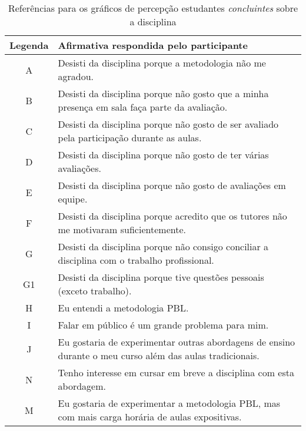 \begin{table}[h]
\caption{Referências para os gráficos de percepção estudantes \textit{concluintes} sobre a disciplina}
\label{tabela-ref-graficos3}
\begin{tabular}{c|p{14.6cm}}
Legenda & Afirmativa respondida pelo participante \\
\hline
A & Desisti da disciplina porque a metodologia não me agradou.\\
\hline
B & Desisti da disciplina porque não gosto que a minha presença em sala faça parte da avaliação.\\
\hline
C & Desisti da disciplina porque não gosto de ser avaliado pela participação durante as aulas.\\
\hline
D & Desisti da disciplina porque não gosto de ter várias avaliações.\\
\hline
E & Desisti da disciplina porque não gosto de avaliações em equipe.\\
\hline
F & Desisti da disciplina porque acredito que os tutores não me motivaram suficientemente.\\
\hline
G & Desisti da disciplina porque não consigo conciliar a disciplina com o trabalho profissional.\\
\hline
G1 & Desisti da disciplina porque tive questões pessoais (exceto trabalho).\\
\hline
H & Eu entendi a metodologia PBL.\\
\hline
I & Falar em público é um grande problema para mim.\\
\hline
J & Eu gostaria de experimentar outras abordagens de ensino durante o meu curso além das aulas tradicionais.\\
\hline
N & Tenho interesse em cursar em breve a disciplina com esta abordagem.\\
\hline
M & Eu gostaria de experimentar a metodologia PBL, mas com mais carga horária de aulas expositivas.\\
\end{tabular}
\end{table}
